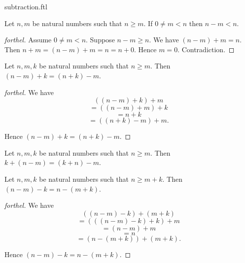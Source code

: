 \documentclass{naproche-library}
\begin{document}
\begin{smodule}{subtraction.ftl}
  \begin{proposition}[forthel,id=ARITHMETIC_05_1269537257291776,printid]
    Let $n, m$ be natural numbers such that $n \geq m$.
    If $0 \neq m < n$ then $n - m < n$.
  \end{proposition}
  \begin{proof}[forthel]
    Assume $0 \neq m < n$.
    Suppose $n - m \geq n$.
    We have $(n - m) + m = n$.
    Then $n + m
      = (n - m) + m
      = n
      = n + 0$.
    Hence $m = 0$.
    Contradiction.
  \end{proof}

  \begin{proposition}[forthel,id=ARITHMETIC_05_4767595811045376,printid]
    Let $n, m, k$ be natural numbers such that $n \geq m$.
    Then $(n - m) + k = (n + k) - m$.
  \end{proposition}
  \begin{proof}[forthel]
    We have
    \[  ((n - m) + k) + m       \]
    \[    = ((n - m) + m) + k   \]
    \[    = n + k               \]
    \[    = ((n + k) - m) + m.  \]

    Hence $(n - m) + k = (n + k) - m$.
  \end{proof}

  \begin{corollary}[forthel,id=ARITHMETIC_05_7578468875239424,printid]
    Let $n, m, k$ be natural numbers such that $n \geq m$.
    Then $k + (n - m) = (k + n) - m$.
  \end{corollary}

  \begin{proposition}[forthel,id=ARITHMETIC_05_7595909347016704,printid]
    Let $n, m, k$ be natural numbers such that $n \geq  m + k$.
    Then $(n - m) - k = n - (m + k)$.
  \end{proposition}
  \begin{proof}[forthel]
    We have
    \[  ((n - m) - k) + (m + k)       \]
    \[    = (((n - m) - k) + k) + m   \]
    \[    = (n - m) + m               \]
    \[    = n                         \]
    \[    = (n - (m + k)) + (m + k).  \]

    Hence $(n - m) - k = n - (m + k)$.
  \end{proof}
\end{smodule}
\end{document}
